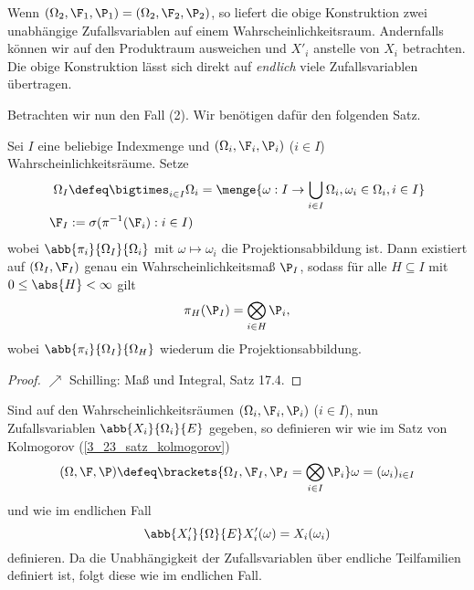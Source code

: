 Wenn $(\Omega_2, \F_1, \P_1) = (\Omega_2, \F_2, \P_2)$, so liefert die obige Konstruktion zwei unabhängige Zufallsvariablen auf einem Wahrscheinlichkeitsraum. Andernfalls können wir auf den Produktraum ausweichen und $X'_i$ anstelle von $X_i$ betrachten. Die obige Konstruktion lässt sich direkt auf \textit{endlich} viele Zufallsvariablen übertragen.

Betrachten wir nun den Fall (2). Wir benötigen dafür den folgenden Satz.

\begin{satz}
	\label{3_23_satz_kolmogorov}
	Sei $I$ eine beliebige Indexmenge und $(\Omega_i, \F_i, \P_i)$ ($i \in I$) Wahrscheinlichkeitsräume. Setze
	\begin{equation*}
		\begin{aligned}
		\Omega_I &\defeq \bigtimes_{i \in I} \Omega_i = \menge{\omega : I \to \bigcup_{i \in I} \Omega_i, \omega_i \in \Omega_i, i \in I}\\
		\F_I &:= \sigma( \pi^{-1} ( \F_i) : i \in I)
		\end{aligned}
	\end{equation*}
	wobei $\abb{\pi_i}{\Omega_I}{\Omega_i}$ mit $\omega \mapsto \omega_i$ die Projektionsabbildung ist. Dann existiert auf $(\Omega_I, \F_I)$ genau ein Wahrscheinlichkeitsmaß $\P_I$, sodass für alle $H \subseteq I$ mit $0 \le \abs{H} < \infty$ gilt
	\begin{equation*}
		\pi_H ( \P_I) = \bigotimes_{i \in H} \P_i,
	\end{equation*}
	wobei $\abb{\pi_i}{\Omega_I}{\Omega_H}$ wiederum die Projektionsabbildung.
\end{satz}
\begin{proof}
	$\nearrow$ Schilling: Maß und Integral, Satz 17.4.
\end{proof}

Sind auf den Wahrscheinlichkeitsräumen $(\Omega_i , \F_i , \P_i)$ ($i \in I$), nun Zufallsvariablen $\abb{X_i}{\Omega_i}{E}$ gegeben, so definieren wir wie im Satz von Kolmogorov (\cref{3_23_satz_kolmogorov})
\begin{equation*}
	(\Omega, \F, \P) \defeq \brackets{\Omega_I, \F_I, \P_I = \bigotimes_{i \in I} \P_i} \mit \omega = (\omega_i)_{i \in I}
\end{equation*}
und wie im endlichen Fall
\begin{equation*}
	\abb{X_i'}{\Omega}{E} \mit X_i'(\omega) = X_i(\omega_i)
\end{equation*}
definieren. Da die Unabhängigkeit der Zufallsvariablen über endliche Teilfamilien definiert ist, folgt diese wie im endlichen Fall. 